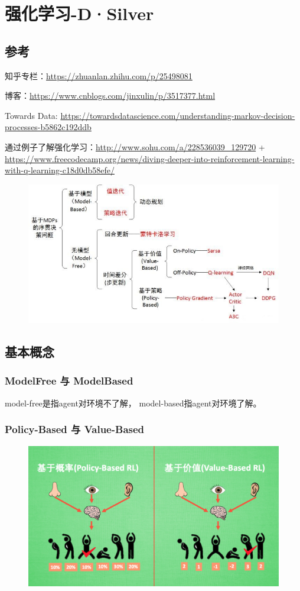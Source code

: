 \documentclass[UTF8,a4paper,12pt]{ctexbook}
\begin{document}
\chapter{强化学习-D·Silver}
	\section{参考}
		知乎专栏：\url{https://zhuanlan.zhihu.com/p/25498081}
		
		博客：\url{https://www.cnblogs.com/jinxulin/p/3517377.html}
		
		Towards Data: \url{https://towardsdatascience.com/understanding-markov-decision-processes-b5862c192ddb}
		
		通过例子了解强化学习：\url{http://www.sohu.com/a/228536039_129720} + \\ \url{https://www.freecodecamp.org/news/diving-deeper-into-reinforcement-learning-with-q-learning-c18d0db58efe/}
		
		\begin{figure}[H]
			\centering
			\includegraphics[width=.9\linewidth]{MDPs}
		\end{figure}
		
		
	\section{基本概念}
		\subsection{ModelFree 与 ModelBased}
			model-free是指agent对环境不了解， model-based指agent对环境了解。
				
	
		\subsection{Policy-Based 与  Value-Based}
			\begin{figure}[H]
				\centering
				\includegraphics[width=.8\linewidth]{PolicyWithValue}
			\end{figure}
			
\end{document}
